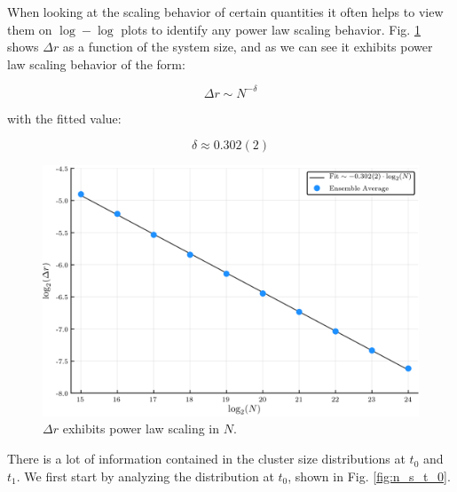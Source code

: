 When looking at the scaling behavior of certain quantities it often helps to view them on $\log-\log$ plots to identify any power law scaling behavior.
Fig. \ref{fig:delta_r_scaling} shows $\Delta r$ as a function of the system size, and as we can see it exhibits power law scaling behavior of the form:

\begin{equation}
	\Delta r \sim N^{-\delta}
\end{equation}

with the fitted value:

\begin{equation}
	\delta \approx 0.302(2)
\end{equation}

\begin{figure}[H]
	\centering
	\includegraphics[width=350pt, clip]{images/delta_r_scaling.png}
	\caption{$\Delta r$ exhibits power law scaling in $N$.}
	\label{fig:delta_r_scaling}
\end{figure}

There is a lot of information contained in the cluster size distributions at $t_0$ and $t_1$.
We first start by analyzing the distribution at $t_0$, shown in Fig. \ref{fig:n_s_t_0}.

